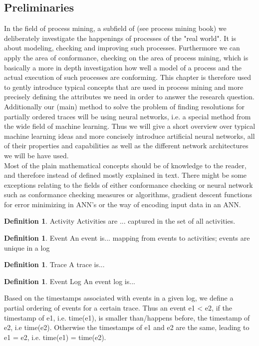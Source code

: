 \documentclass[
	a4paper,
	pagesize,
	pdftex,
	12pt,
	ngerman,
	fleqn,
	final,
	]{scrartcl}
\theoremstyle{plain}
\theoremstyle{definition}
\newtheorem{defn}[thm]{Definition}
\begin{document}
	\subsection{Preliminaries}
		In the field of process mining, a subfield of (see process mining book) we deliberately investigate the happenings of processes of the "real world". 
		It is about modeling, checking and improving such processes. Furthermore we can apply the area of conformance, checking on the area of process mining, which is basically a more in depth investigation how well a model of a process and the actual execution of such processes are conforming. This chapter is therefore used to gently introduce typical concepts that are used in process mining and more precisely defining the attributes we need in order to answer the research question. Additionally our (main) method to solve the problem of finding resolutions for partially ordered traces will be using neural networks, i.e. a special method from the wide field of machine learning. Thus we will give a short overview over typical machine learning ideas and more concisely introduce artificial neural networks, all of their properties and capabilities as well as the different network architectures we will be have used. \\
		Most of the plain mathematical concepts should be of knowledge to the reader, and therefore instead of defined mostly explained in text. There might be some exceptions relating to the fields of either conformance checking or neural network such as conformance checking measures or algorithms, gradient descent functions for error minimizing in ANN's or the way of encoding input data in an ANN.
		\begin{defn}{Activity}
			Activities are ... captured in the set of all activities.
		\end{defn}
		\begin{defn}{Event}
			An event is... mapping from events to activities; events are unique in a log
		\end{defn}
		\begin{defn}{Trace}
			A trace is...
		\end{defn}
		\begin{defn}{Event Log}
			An event log is...
		\end{defn}
		Based on the timestamps associated with events in a given log, we define a partial ordering of events for a certain trace. Thus an event e1 < e2, if the timestamp of e1, i.e. time(e1), is smaller than/happens before, the timestamp of e2, i.e time(e2). Otherwise the timestamps of e1 and e2 are the same, leading to e1 = e2, i.e. time(e1) = time(e2).
\end{document}
